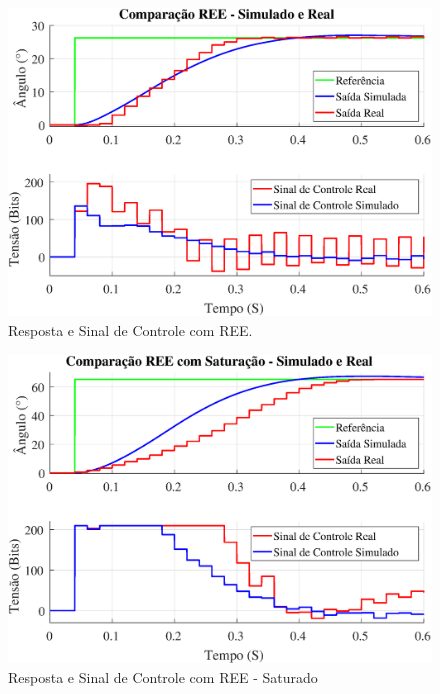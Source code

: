 \documentclass[conference,harvard,brazil,english]{sbatex}
\begin{document}
            \begin{figure}[!htb] 
                \centering
                    \includegraphics[width=\columnwidth]{imagens/malhafechada/SimuRealSSnSat.eps}{
                    \small
                    \centering
                    \caption{Resposta e Sinal de Controle com REE.}
                    \label{SS_n_sat}}
            \end{figure}
            
            \begin{figure}[!htb] 
                \centering
                    \includegraphics[width=\columnwidth]{imagens/malhafechada/SimuRealSSsat.eps}{
                    \small
                    \centering
                    \caption{Resposta e Sinal de Controle com REE - Saturado}
                    \label{SS_sat}}
            \end{figure}
        
\end{document}

